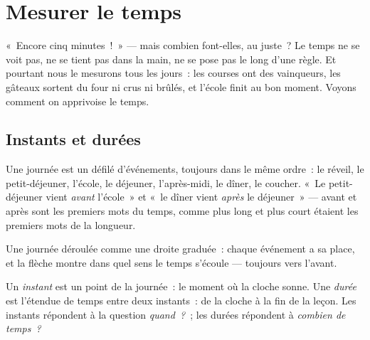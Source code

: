 \chapter{Mesurer le temps}\label{ch:g2:measuring-time}

«~Encore cinq minutes~!~» --- mais combien font-elles, au juste~? Le
temps ne se voit pas, ne se tient pas dans la main, ne se pose pas le
long d'une règle. Et pourtant nous le mesurons tous les jours~: les
courses ont des vainqueurs, les gâteaux sortent du four ni crus ni
brûlés, et l'école finit au bon moment. Voyons comment on apprivoise
le temps.

\section{Instants et durées}

\begin{example}\label{ex:g2:measuring-time:order}
Une journée est un défilé d'événements, toujours dans le même ordre~:
le réveil, le petit-déjeuner, l'école, le déjeuner, l'après-midi, le
dîner, le coucher. «~Le petit-déjeuner vient \emph{avant} l'école~»
et «~le dîner vient \emph{après} le déjeuner~» --- avant et après
sont les premiers mots du temps, comme plus long et plus court
étaient les premiers mots de la longueur.
\end{example}

\begin{omfigure}

{\small Une journée déroulée comme une droite graduée~: chaque
événement a sa place, et la flèche montre dans quel sens le temps
s'écoule --- toujours vers l'avant.}
\end{omfigure}

\begin{definition}[Durée]\label{def:g2:measuring-time:duration}
Un \emph{instant} est un point de la journée~: le
moment où la cloche sonne. Une \emph{durée} est
l'étendue de temps entre deux instants~: de la cloche à la fin de la
leçon. Les instants répondent à la question \emph{quand~?}~; les
durées répondent à \emph{combien de temps~?}
\end{definition}

